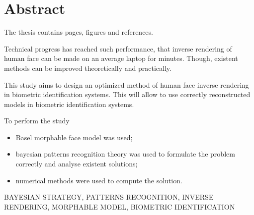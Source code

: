 \chapter*{Abstract}

The thesis contains \pageref{LastPage} pages,
 figures
and  references.

Technical progress has reached such performance,
that inverse rendering of human face can be made on an average laptop
for minutes.
Though, existent methods can be improved theoretically and practically.

This study aims to design an optimized method
of human face inverse rendering in biometric identification systems.
This will allow to use correctly reconstructed models
in biometric identification systems.

To perform the study
\begin{itemize}
  \item
    Basel morphable face model was used;
  \item
    bayesian patterns recognition theory was used
    to formulate the problem correctly and analyse existent solutions;
  \item
    numerical methods were used to compute the solution.
\end{itemize}

\MakeUppercase{bayesian strategy, patterns recognition,
 inverse rendering, morphable model,
biometric identification}
